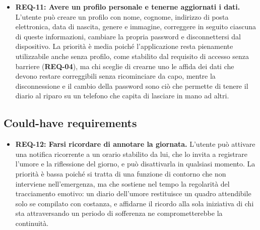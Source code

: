 \begin{itemize}
    \item \textbf{REQ-11: Avere un profilo personale e tenerne aggiornati i dati.} L'utente può creare un profilo con nome, cognome, indirizzo di posta elettronica, data di nascita, genere e immagine, correggere in seguito ciascuna di queste informazioni, cambiare la propria password e disconnettersi dal dispositivo. La priorità è media poiché l'applicazione resta pienamente utilizzabile anche senza profilo, come stabilito dal requisito di accesso senza barriere (\textbf{REQ-04}), ma chi sceglie di crearne uno le affida dei dati che devono restare correggibili senza ricominciare da capo, mentre la disconnessione e il cambio della password sono ciò che permette di tenere il diario al riparo su un telefono che capita di lasciare in mano ad altri.
\end{itemize}

\subsection{Could-have requirements}
\label{subsec:could-have}

\begin{itemize}
    \item \textbf{REQ-12: Farsi ricordare di annotare la giornata.} L'utente può attivare una notifica ricorrente a un orario stabilito da lui, che lo invita a registrare l'umore e la riflessione del giorno, e può disattivarla in qualsiasi momento. La priorità è bassa poiché si tratta di una funzione di contorno che non interviene nell'emergenza, ma che sostiene nel tempo la regolarità del tracciamento emotivo: un diario dell'umore restituisce un quadro attendibile solo se compilato con costanza, e affidarne il ricordo alla sola iniziativa di chi sta attraversando un periodo di sofferenza ne comprometterebbe la continuità.
\end{itemize}
